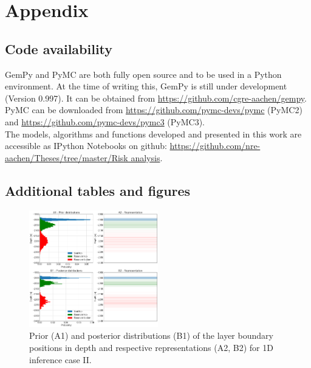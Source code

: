 \documentclass[a4paper,11pt]{MScThesis}
\begin{document}
\cleardoublepage
		
		
		
		




%
    


\appendix

    \chapter{Appendix}
    \section{Code availability}
    	GemPy and PyMC are both fully open source and to be used in a Python environment. At the time of writing this, GemPy is still under development (Version 0.997). It can be obtained from \url{https://github.com/cgre-aachen/gempy}. PyMC can be downloaded from \url{https://github.com/pymc-devs/pymc} (PyMC2) and \url{https://github.com/pymc-devs/pymc3} (PyMC3).\\
    	The models, algorithms and functions developed and presented in this work are accessible as IPython Notebooks on github: \url{https://github.com/nre-aachen/Theses/tree/master/Risk analysis}.
\newpage
    \section{Additional tables and figures}
    
    \begin{figure}[h]
    	\centering
    	\includegraphics[width=0.50\textwidth]{Figures/Appendix/update_goodseal1}
    	\caption{Prior (A1) and posterior distributions (B1) of the layer boundary positions in depth and respective representations (A2, B2) for 1D inference case II.}\label{fig:update_goodseal1}
    \end{figure}
\end{document}
